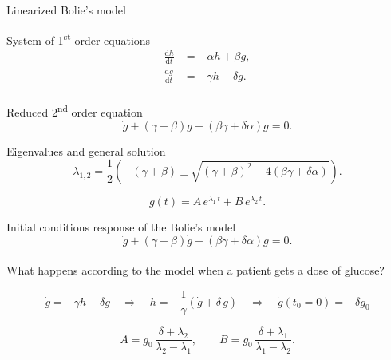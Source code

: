 \documentclass{beamer}
\providecommand{\m}[1]{\ensuremath{\mathrm{#1}}}
\begin{document}
\begin{frame}{Linearized Bolie's model}

System of 1\textsuperscript{st} order equations
\begin{equation*}
\begin{aligned}
\frac{\m{d}h}{\m{d}t}&=-\alpha h + \beta g,\\
\frac{\m{d}g}{\m{d}t}&=-\gamma h - \delta g.\\
\end{aligned}
\end{equation*}

Reduced 2\textsuperscript{nd} order equation
\begin{equation*}
	\ddot g+(\gamma+\beta)\dot g+(\beta \gamma+\delta \alpha)g=0.
\end{equation*}

Eigenvalues and general solution
\begin{equation*}
	\lambda_{1,2}=\frac{1}{2}\left(-(\gamma+\beta)\pm \sqrt{(\gamma+\beta)^2-4(\beta\gamma+\delta\alpha)}\right).
\end{equation*}

\begin{equation*}
	g(t) = A\,e^{\lambda_1 \, t} + B\,e^{\lambda_2 \, t}.
\end{equation*}

\end{frame}

\begin{frame}{Initial conditions response of the Bolie's model}
\begin{equation*}
	\ddot g+(\gamma+\beta)\dot g+(\beta \gamma+\delta \alpha)g=0.
\end{equation*}\\
\vspace{1cm}
What happens according to the model when a patient gets a dose of glucose?\\


\begin{equation*}
\dot g=-\gamma h - \delta g \quad \Rightarrow \quad h = -\frac{1}{\gamma}\left( \dot{g} + \delta\,g \right) \quad \Rightarrow  \quad \dot g(t_0=0)=-\delta g_0
\end{equation*}

\begin{equation*}	
	A = g_0\,\frac{\delta+\lambda_2}{\lambda_2-\lambda_1}, \qquad B = g_0\,\frac{\delta+\lambda_1}{\lambda_1-\lambda_2}.
\end{equation*}


\end{frame}
\end{document}
